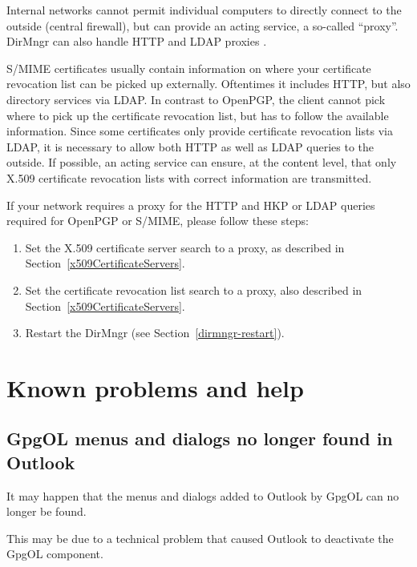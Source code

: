 \documentclass[a4paper,11pt,oneside,openright,titlepage]{scrbook}
\begin{document}
\begin{description}
    Internal networks cannot permit individual computers to directly
    connect to the outside (central firewall), but can provide an
    acting service, a so-called ``proxy''. DirMngr can also handle
    HTTP and LDAP proxies  .

    S/MIME certificates usually contain information on where your
    certificate revocation list can be picked up externally.
    Oftentimes it includes HTTP, but also directory services via
    LDAP. In contrast to OpenPGP, the client cannot pick
    where to pick up the certificate revocation list, but has to
    follow the available information. Since some certificates only
    provide certificate revocation lists via LDAP, it is necessary to
    allow both HTTP as well as LDAP queries to the outside. If
    possible, an acting service can ensure, at the content level, that
    only X.509 certificate revocation lists with correct information
    are transmitted.

    If your network requires a proxy for the HTTP and HKP or LDAP
    queries required for OpenPGP or S/MIME, please follow these
    steps:

    \begin{enumerate}
        \item Set the X.509 certificate server search to a proxy, as
            described in Section~\ref{x509CertificateServers}.
        \item Set the certificate revocation list search to a proxy,
            also described in Section~\ref{x509CertificateServers}.
        \item Restart the DirMngr (see Section~\ref{dirmngr-restart}).
     \end{enumerate}
\end{description}


\clearpage
\chapter{Known problems and help}

\section{GpgOL menus and dialogs no longer found in Outlook}
It may happen that the menus and dialogs added to Outlook by GpgOL can
no longer be found.

This may be due to a technical problem that caused Outlook to
deactivate the GpgOL component.
\end{document}
